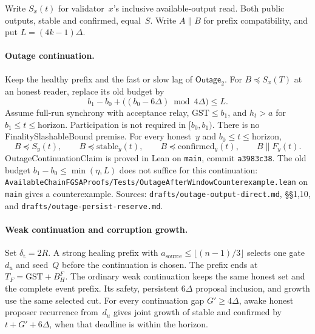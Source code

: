 \documentclass{article}
\begin{document}
Write $S_x(t)$ for validator~$x$'s inclusive available-output read.
Both public outputs, stable and confirmed, equal~$S$.  Write $A\parallel B$
for prefix compatibility, and put $L=(4k-1)\Delta$.

\paragraph{Outage continuation.}
Keep the healthy prefix and the fast or slow lag of $\textsf{Outage}_2$.
For $B\preceq S_x(T)$ at an honest reader, replace its old budget by
\[
 b_1-b_0+\bigl((b_0-6\Delta)\bmod 4\Delta\bigr)\leq L. \tag{V}
\]
Assume full-run synchrony with acceptance relay, $\mathrm{GST}\leq b_1$,
and $h_t>a$ for $b_1\leq t\leq\mathrm{horizon}$.  Participation is not
required in $[b_0,b_1)$.  There is no \textsf{FinalitySlashableBound}
premise.  For every honest~$y$ and $b_0\leq t\leq\mathrm{horizon}$,
\[
 B\preceq S_y(t),\qquad B\preceq\mathrm{stable}_y(t),\qquad
 B\preceq\mathrm{confirmed}_y(t),\qquad B\parallel F_y(t).
\]
\textsf{OutageContinuationClaim} is proved in Lean on \texttt{main},
commit \texttt{a3983c38}.  The old budget
$b_1-b_0\leq\min(\eta,L)$ does not suffice for this continuation:
\newline\texttt{AvailableChainFGSAProofs/Tests/OutageAfterWindowCounterexample.lean}\newline
on \texttt{main} gives a counterexample.  Sources: \nolinkurl{drafts/outage-output-direct.md},
\S\S1,10, and \nolinkurl{drafts/outage-persist-reserve.md}.

\paragraph{Weak continuation and corruption growth.}
Set $\delta_{\mathrm t}=2R$.  A strong healing prefix with
$a_{\mathrm{source}}\leq\lfloor(n-1)/3\rfloor$ selects one gate~$d_u$
and seed~$Q$ before the continuation is chosen.  The prefix ends at
$T_F=\mathrm{GST}+B_H^F$.  The ordinary weak continuation keeps the
same honest set and the complete event prefix.  Its safety, persistent
$6\Delta$ proposal inclusion, and growth use the same selected cut.
For every continuation gap $G'\geq4\Delta$, awake honest proposer
recurrence from~$d_u$ gives joint growth of stable and confirmed by
$t+G'+6\Delta$, when that deadline is within the horizon.
\end{document}
